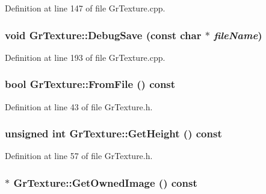 Definition at line 147 of file GrTexture.cpp.\hypertarget{class_gr_texture_35c6eed25d22b0b360f57c518e2188b4}{
\subsubsection[{DebugSave}]{\setlength{\rightskip}{0pt plus 5cm}void GrTexture::DebugSave (const char $\ast$ {\em fileName})}}
\label{class_gr_texture_35c6eed25d22b0b360f57c518e2188b4}




Definition at line 193 of file GrTexture.cpp.\hypertarget{class_gr_texture_3467681d14e81406629f9b611016aaa9}{
\subsubsection[{FromFile}]{\setlength{\rightskip}{0pt plus 5cm}bool GrTexture::FromFile () const}}
\label{class_gr_texture_3467681d14e81406629f9b611016aaa9}




Definition at line 43 of file GrTexture.h.\hypertarget{class_gr_texture_2b073d233b3501d76257589edc417996}{
\subsubsection[{GetHeight}]{\setlength{\rightskip}{0pt plus 5cm}unsigned int GrTexture::GetHeight () const}}
\label{class_gr_texture_2b073d233b3501d76257589edc417996}




Definition at line 57 of file GrTexture.h.\hypertarget{class_gr_texture_abe145a3b9a78ffcbb468ed493c97357}{
\subsubsection[{GetOwnedImage}]{$\ast$ GrTexture::GetOwnedImage () const}}
\label{class_gr_texture_abe145a3b9a78ffcbb468ed493c97357}




